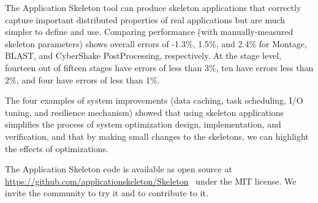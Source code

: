 \documentclass[preprint,12pt]{elsarticle}
\newcommand{\katznote}[1]{ {\textcolor{blue}    { ***Dan:   #1 }}}
\newcommand{\zhaonote}[1]{{\textcolor{darkgreen}{ ***Zhao:  #1 }}}
\newcommand{\katznote}[1]{}
\newcommand{\zhaonote}[1]{}
\begin{document}



The Application Skeleton tool can produce skeleton applications that correctly capture important distributed properties of real applications but 
are much simpler to define and use.
Comparing performance (with manually-measured skeleton parameters) shows overall errors of  -1.3\%, 1.5\%, and 2.4\%  for Montage, BLAST, and CyberShake PostProcessing, respectively.
At the stage level, fourteen out of fifteen stages have errors of less than 3\%, ten have errors less than 2\%, and four have errors of less than 1\%.

The four examples of system improvements (data caching, task scheduling, I/O tuning, and resilience mechanism) 
showed that using skeleton applications simplifies the process of system optimization design, implementation, and verification, and that by making small changes to the skeletons, we can highlight the effects of optimizations.

The Application Skeleton code is available as open source at \url{https://github.com/applicationskeleton/Skeleton}~\cite{skeleton-software-v1.2} under the MIT license. We invite the community to try it and to contribute to it.
\end{document}
